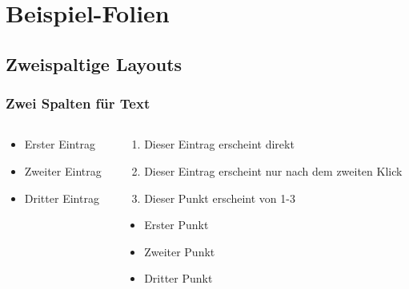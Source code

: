 \documentclass[9pt]{beamer}
\begin{document}
\section{Beispiel-Folien}
\subsection{Zweispaltige Layouts}
\begin{frame}
    \frametitle{Zwei Spalten für Text}
    \begin{columns}[T]
        \begin{column}{0.49\textwidth}
            \begin{itemize}[<+->] %
                \item Erster  Eintrag
                \item Zweiter Eintrag
			    \item Dritter Eintrag
		    \end{itemize}
        \end{column}
        \begin{column}{0.49\textwidth}
		    \begin{enumerate}
			    \item<1-> Dieser Eintrag erscheint direkt
                \item<2>  Dieser Eintrag erscheint nur nach dem zweiten Klick
                \item<1-3> Dieser Punkt erscheint von 1-3
          \end{enumerate}
          \begin{itemize}[<+->]
              \item Erster  Punkt
              \item Zweiter Punkt
              \item Dritter Punkt
          \end{itemize}
        \end{column}
    \end{columns}
\end{frame}
\end{document}
